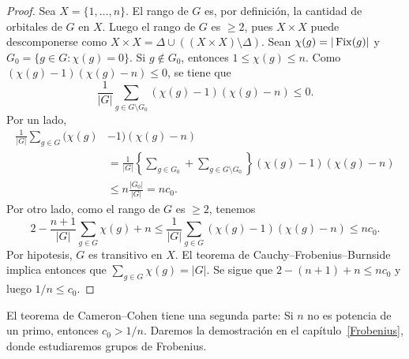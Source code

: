 \begin{proof}
Sea $X=\{1,\dots,n\}$. El rango de $G$ es, por definición, la cantidad de orbitales de $G$ en $X$. Luego 
el rango de $G$ es $\geq2$, pues $X\times X$ puede descomponerse como 
$X\times X=\Delta\cup\left((X\times X)\setminus\Delta\right)$. 
Sean $\chi(g)=|\operatorname{Fix}(g)|$ y $G_0=\{g\in G:\chi(g)=0\}$. Si $g\not\in G_0$, entonces $1\leq\chi(g)\leq n$. Como 
$(\chi(g)-1)(\chi(g)-n)\leq 0$,
se tiene que 
\[
\frac{1}{|G|}\sum_{g\in G\setminus G_0}(\chi(g)-1)(\chi(g)-n)\leq 0.
\]
Por un lado, 
\begin{align*}
\frac{1}{|G|}\sum_{g\in G}(\chi(g)&-1)(\chi(g)-n)\\
&=\frac{1}{|G|}\left\{\sum_{g\in G_0}+\sum_{g\in G\setminus G_0}\right\}(\chi(g)-1)(\chi(g)-n)\\
&\leq n\frac{|G_0|}{|G|}=nc_0.
\end{align*}
Por otro lado, como el rango de $G$ es $\geq2$, tenemos 
\begin{equation}
    \label{eq:CameronCohen}
    2-\frac{n+1}{|G|}\sum_{g\in G}\chi(g)+n\leq 
    \frac{1}{|G|}\sum_{g\in G}(\chi(g)-1)(\chi(g)-n)\leq nc_0.
\end{equation}
Por hipotesis, $G$ es transitivo en $X$. El teorema de Cauchy--Frobenius--Burnside implica entonces que 
$\sum_{g\in G}\chi(g)=|G|$. Se sigue que $2-(n+1)+n\leq nc_0$ y luego $1/n\leq c_0$. 
\end{proof}

El teorema de Cameron--Cohen tiene una segunda parte: 
Si $n$ no es potencia de un primo, entonces $c_0>1/n$. 
Daremos la demostración en el capítulo~\ref{Frobenius}, donde 
estudiaremos grupos de Frobenius.  

